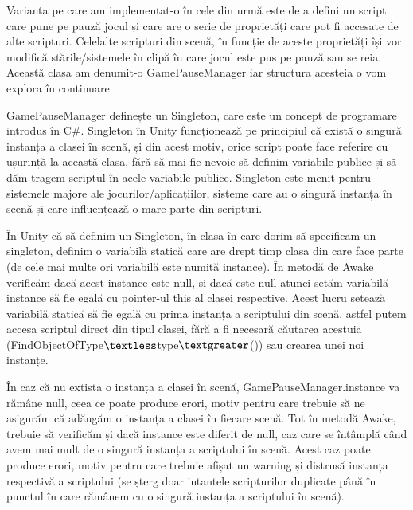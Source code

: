 \documentclass[12pt, a4paper]{article}
\begin{document}
	Varianta pe care am implementat-o în cele din urmă este de a defini un script care pune pe pauză jocul și care are o serie de proprietăți care pot fi accesate de alte scripturi. Celelalte scripturi din scenă, în funcție de aceste proprietăți își vor modifică stările/sistemele în clipă în care jocul este pus pe pauză sau se reia. Această clasa am denumit-o GamePauseManager iar structura acesteia o vom explora în continuare.
	\newline
	
	GamePauseManager definește un Singleton, care este un concept de programare introdus în C\#. Singleton în Unity funcționează pe principiul că există o singură instanța a clasei în scenă, și din acest motiv, orice script poate face referire cu ușurință la această clasa, fără să mai fie nevoie să definim variabile publice și să dăm tragem scriptul în acele variabile publice. Singleton este menit pentru sistemele majore ale jocurilor/aplicațiilor, sisteme care au o singură instanța în scenă și care influențează o mare parte din scripturi. 
	\newline
	
	În Unity că să definim un Singleton, în clasa în care dorim să specificam un singleton, definim o variabilă statică care are drept timp clasa din care face parte (de cele mai multe ori variabilă este numită instance). În metodă de Awake verificăm dacă acest instance este null, și dacă este null atunci setăm variabilă instance să fie egală cu pointer-ul this al clasei respective. Acest lucru setează variabilă statică să fie egală cu prima instanța a scriptului din scenă, astfel putem accesa scriptul direct din tipul clasei, fără a fi necesară căutarea acestuia (FindObjectOfType$\textless$type$\textgreater$()) sau crearea unei noi instanțe. 
	\newline
	
	În caz că nu extista o instanța a clasei în scenă, GamePauseManager.instance va rămâne null, ceea ce poate produce erori, motiv pentru care trebuie să ne asigurăm că adăugăm o instanța a clasei în fiecare scenă. Tot în metodă Awake, trebuie să verificăm și dacă instance este diferit de null, caz care se întâmplă când avem mai mult de o singură instanța a scriptului în scenă. Acest caz poate produce erori, motiv pentru care trebuie afișat un warning și distrusă instanța respectivă a scriptului (se șterg doar intantele scripturilor duplicate până în punctul în care rămânem cu o singură instanța a scriptului în scenă).
	\newline
	
\end{document}
